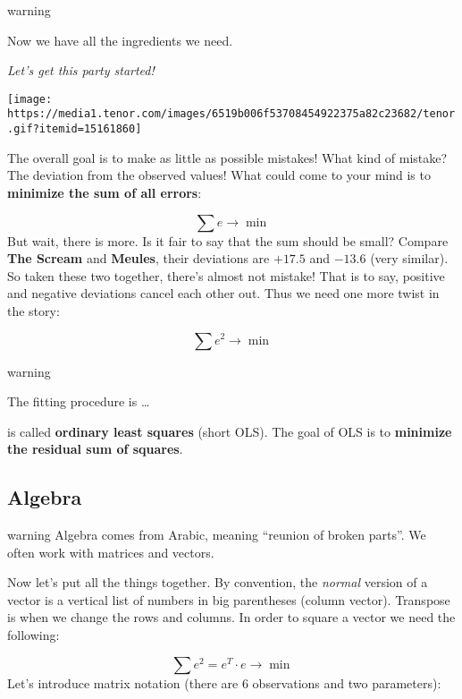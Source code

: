 \documentclass[
]{book}
\begin{document}
\begin{infobox}warning

Now we have all the ingredients we need.

\emph{Let's get this party started!}

\texttt{[image: https://media1.tenor.com/images/6519b006f53708454922375a82c23682/tenor.gif?itemid=15161860]}

\end{infobox}

The overall goal is to make as little as possible mistakes! What kind of mistake? The deviation from the observed values! What could come to your mind is to \textbf{minimize the sum of all errors}:

\[\sum e \rightarrow \min\]
But wait, there is more. Is it fair to say that the sum should be small? Compare \textbf{The Scream} and \textbf{Meules}, their deviations are \(+17.5\) and \(-13.6\) (very similar). So taken these two together, there's almost not mistake! That is to say, positive and negative deviations cancel each other out. Thus we need one more twist in the story:

\[\sum e^2 \rightarrow \min\]

\begin{infobox}warning

The fitting procedure is \ldots{}

is called \textbf{ordinary least squares} (short OLS). The goal of OLS is to \textbf{minimize the residual sum of squares}.

\end{infobox}

\hypertarget{algebra}{%
\subsection{Algebra}\label{algebra}}

\begin{infobox}warning
Algebra comes from Arabic, meaning ``reunion of broken parts''. We often work with matrices and vectors.

\end{infobox}

Now let's put all the things together. By convention, the \emph{normal} version of a vector is a vertical list of numbers in big parentheses (column vector). Transpose is when we change the rows and columns. In order to square a vector we need the following:

\[\sum e^2 = e^T \cdot e \rightarrow \min\]
Let's introduce matrix notation (there are 6 observations and two parameters):
\end{document}
